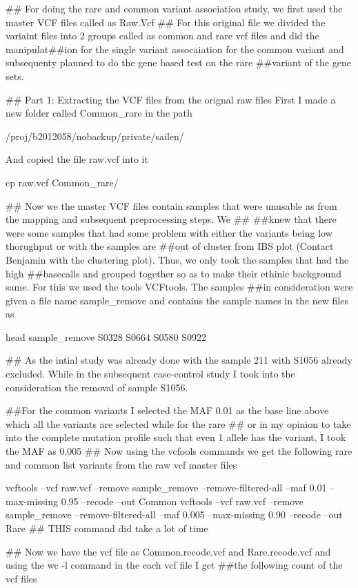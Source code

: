 ## For doing the rare and common variant association study, we first used the master VCF files called as Raw.Vcf 
## For this original file we divided the variaint files into 2 groups called as common and rare vcf files and did the manipulat##ion for the single variant assocaiation for the common variant and subsequenty planned to do the gene based test on the rare ##variant of the gene sets. 

## Part 1: Extracting the VCF files from the orignal raw files
First I made a new folder called Common_rare in the path 

/proj/b2012058/nobackup/private/sailen/

And copied the file raw.vcf into it

cp raw.vcf Common_rare/

## Now we the master VCF files contain samples that were unusable as from the mapping and subsequent preprocessing steps. We ## ##knew that there were some samples that had some problem with either the variants being low thorughput or with the samples are ##out of cluster from IBS plot (Contact Benjamin with the clustering plot). Thus, we only took the samples that had the high ##basecalls and grouped together so as to make their ethinic background same. For this we used the tools VCFtools. The samples ##in consideration were given a file name sample_remove and contains the sample names in the new files as
 
head sample_remove
S0328
S0664
S0580
S0922


## As the intial study was already done with the sample 211 with S1056 already excluded. While in the subsequent case-control study I took into the consideration the removal of sample S1056.

##For the common variants I selected the MAF 0.01 as the base line above which all the variants are selected while for the rare ## or in my opinion to take into the complete mutation profile such that even 1 allele has the variant, I took the MAF as 0.005 ## Now using the vcfools commands we get the following rare and common list variants from the raw vcf master files

 vcftools --vcf raw.vcf --remove sample_remove --remove-filtered-all --maf 0.01 --max-missing 0.95 --recode --out Common
 vcftools --vcf raw.vcf --remove sample_remove --remove-filtered-all --maf 0.005 --max-missing 0.90 --recode --out Rare
 ## THIS command did take a lot of time 
 
 ## Now we have the vcf file as Common.recode.vcf and Rare.recode.vcf and using the wc -l command in the each vcf file I get ##the following count of the vcf files


